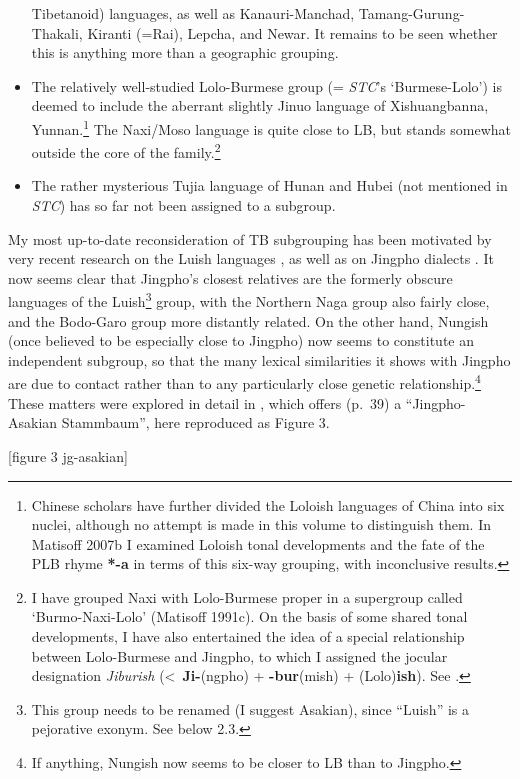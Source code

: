 \begin{itemize}
\mbox{Tibetanoid}) languages, as well as Kanauri-Manchad, Tamang-Gurung-Thakali,
Kiranti (=Rai), Lepcha, and Newar. It remains to be seen whether this is anything more than a geographic grouping.
\item The relatively well-studied Lolo-Burmese group (= \textit{STC}’s ‘Burmese-Lolo’) is
deemed to include the aberrant slightly Jinuo language of Xishuangbanna,
Yunnan.\footnote{Chinese scholars have further divided the Loloish languages of
China into six nuclei, although no attempt is made in this volume to distinguish
them. In Matisoff 2007b I examined Loloish tonal developments
and the fate of the PLB rhyme \textbf{*-a} in terms of this six-way grouping, with
inconclusive results.}  The Naxi/Moso language is quite close to LB, but stands
somewhat outside the core of the family.\footnote{I have grouped Naxi with
Lolo-Burmese proper in a supergroup called ‘Burmo-Naxi-Lolo’ (Matisoff 1991c).
On the basis of some shared tonal developments, I have also entertained the idea
of a special relationship between Lolo-Burmese and Jingpho, to which I assigned
the jocular designation \textit{Jiburish} (<~\textbf{Ji-}(ngpho)
+ \textbf{-bur}(mish) + (Lolo)\textbf{ish}). See \citealt{JAM-TJLB,JAM-JR}.}
\item The rather mysterious Tujia language of Hunan and Hubei (not mentioned in \textit{STC}) has so
far not been assigned to a subgroup.
\end{itemize}

My most up-to-date reconsideration of TB subgrouping has been motivated by very recent research on the Luish languages \citep{Huziwara2008,Huziwara2012,Sangdong2013}, as well as on Jingpho dialects \citep{Kurabe2013}. It now seems clear that Jingpho’s closest relatives are the formerly obscure languages of the Luish\footnote{This group needs to be renamed (I suggest Asakian), since “Luish” is a pejorative exonym. See below 2.3.} group, with the Northern Naga group also fairly close, and the Bodo-Garo group more distantly related. On the other hand, Nungish (once believed to be especially close to Jingpho) now seems to constitute an independent subgroup, so that the many lexical similarities it shows with Jingpho are due to contact rather than to any particularly close genetic relationship.\footnote{If anything, Nungish now seems to be closer to LB than to Jingpho.} These matters were explored in detail in \citealt{Matisoff2013}, which offers (p.\ 39) a “Jingpho-Asakian Stammbaum”, here reproduced as Figure 3.

[figure 3 jg-asakian]

